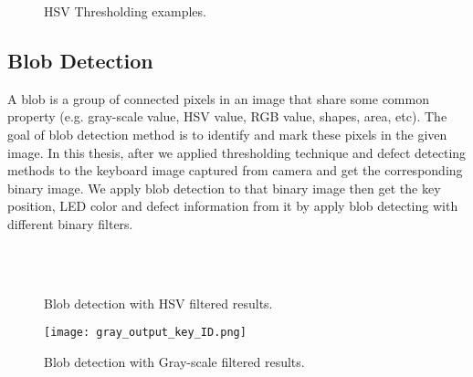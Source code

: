         \begin{figure}[H]
            \caption{HSV Thresholding examples.}
            \label{fig:HSV_detection_Example}
        \end{figure}

    \subsection{Blob Detection}
        A blob is a group of connected pixels in an image that share some common property (e.g. gray-scale value, HSV value, RGB value, shapes, area, etc).
        The goal of blob detection method is to identify and mark these pixels in the given image.
        In this thesis, after we applied thresholding technique and defect detecting methods to the keyboard image captured from camera and get the corresponding binary image.
        We apply blob detection to that binary image then get the key position, LED color and defect information from it by apply blob detecting with different binary filters.
        \begin{figure}[H]
            \centering
            \\
            \\
            \caption{Blob detection with HSV filtered results.}
            \label{fig:HSV_detection_Example}
        \end{figure}

        \begin{figure}[H]
            \texttt{[image: gray\_output\_key\_ID.png]}
            \caption{Blob detection with Gray-scale filtered results.}
            \label{fig:BLOB_detection_Example}
        \end{figure}

